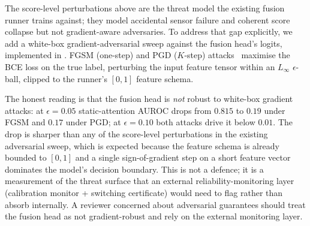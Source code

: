 \documentclass[10pt,conference]{IEEEtran}
\begin{document}
The score-level perturbations above are the threat model the existing
fusion runner trains against; they model accidental sensor failure and
coherent score collapse but not gradient-aware adversaries. To address
that gap explicitly, we add a white-box gradient-adversarial sweep
against the fusion head's logits, implemented in
. FGSM (one-step)
and PGD ($K$-step) attacks~\cite{goodfellow2014explaining,madry2017towards}
maximise the BCE loss on the true label, perturbing the input feature
tensor within an $L_\infty$ $\epsilon$-ball, clipped to the runner's
$[0,1]$ feature schema.


The honest reading is that the fusion head is \emph{not} robust to
white-box gradient attacks: at $\epsilon=0.05$ static-attention AUROC
drops from $0.815$ to $0.19$ under FGSM and $0.17$ under PGD; at
$\epsilon=0.10$ both attacks drive it below $0.01$. The drop is
sharper than any of the score-level perturbations in the existing
adversarial sweep, which is expected because the feature schema is
already bounded to $[0,1]$ and a single sign-of-gradient step on a
short feature vector dominates the model's decision boundary. This is
not a defence; it is a measurement of the threat surface that an
external reliability-monitoring layer (calibration monitor +
switching certificate) would need to flag rather than
absorb internally. A reviewer concerned about adversarial guarantees
should treat the fusion head as not gradient-robust and rely on the
external monitoring layer.
\end{document}

